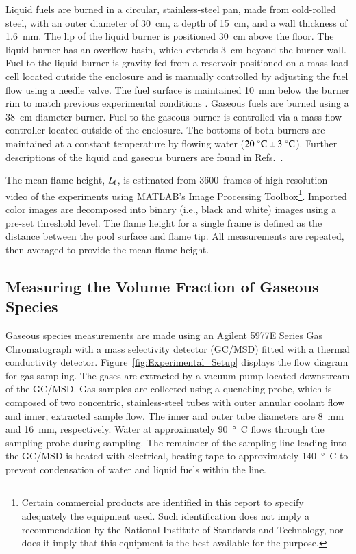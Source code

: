 \documentclass[preprint,review,12pt]{elsarticle}
\begin{document}
Liquid fuels are burned in a circular, stainless-steel pan, made from cold-rolled steel, with an outer diameter of 30~cm, a depth of 15~cm, and a wall thickness of 1.6~mm. The lip of the liquid burner is positioned 30~cm above the floor. The liquid burner has an overflow basin, which extends 3~cm beyond the burner wall. Fuel to the liquid burner is gravity fed from a reservoir positioned on a mass load cell located outside the enclosure and is manually controlled by adjusting the fuel flow using a needle valve. The fuel surface is maintained 10~mm below the burner rim to match previous experimental conditions \cite{Fisher1987,Hamins2016,Kim2019,Weckman1996}. Gaseous fuels are burned using a 38~cm diameter burner. Fuel to the gaseous burner is controlled via a mass flow controller located outside of the enclosure. The bottoms of both burners are maintained at a constant temperature by flowing water ($20 \; ^\circ \hbox{C} \pm 3 \; ^\circ \hbox{C}$). Further descriptions of the liquid and gaseous burners are found in Refs.~\cite{Hamins2016,Hamins1994,Hamins1991,Hamins1996,Lock2008,Hamins1996a}.

The mean flame height, $L_{\rm{f}}$, is estimated from 3600~frames of high-resolution video of the experiments using MATLAB’s Image Processing Toolbox\footnote{\label{fn:product} Certain commercial products are identified in this report to specify adequately the equipment used. Such identification does not imply a recommendation by the National Institute of Standards and Technology, nor does it imply that this equipment is the best available for the purpose.}. Imported color images are decomposed into binary (i.e., black and white) images using a pre-set threshold level. The flame height for a single frame is defined as the distance between the pool surface and flame tip. All measurements are repeated, then averaged to provide the mean flame height.

\subsection{Measuring the Volume Fraction of Gaseous Species}
\label{ssec:Gas_Species_Setup}

Gaseous species measurements are made using an Agilent 5977E Series Gas Chromatograph with a mass selectivity detector (GC/MSD) fitted with a thermal conductivity detector. Figure~\ref{fig:Experimental_Setup} displays the flow diagram for gas sampling. The gases are extracted by a vacuum pump located downstream of the GC/MSD. Gas samples are collected using a quenching probe, which is composed of two concentric, stainless-steel tubes with outer annular coolant flow and inner, extracted sample flow. The inner and outer tube diameters are \SI{8}{mm} and \SI{16}{mm}, respectively. Water at approximately \SI{90}{\degree C} flows through the sampling probe during sampling. The remainder of the sampling line leading into the GC/MSD is heated with electrical, heating tape to approximately \SI{140}{\degree C} to prevent condensation of water and liquid fuels within the line.
\end{document}
